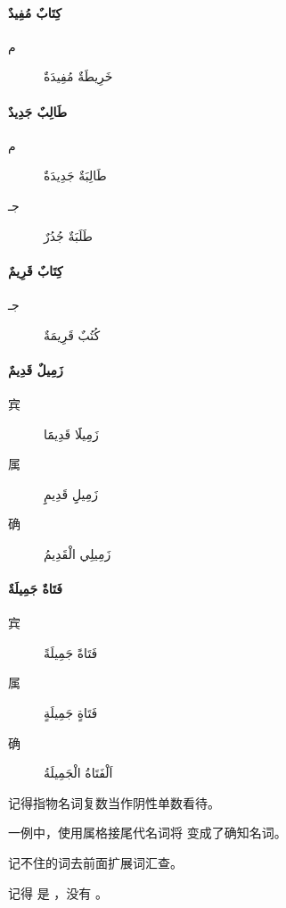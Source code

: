\begin{Arabic}
    \paragraph{كِتَابٌ مُفِيدٌ}
    \begin{description}
        \item [م] خَرِيطَةٌ مُفِيدَةٌ
    \end{description}

    \paragraph{طَالِبٌ جَدِيدٌ}
    \begin{description}
        \item [م] طَالِبَةٌ جَدِيدَةٌ
        \item [جـ] طَلَبَةٌ جُدُرٌ
    \end{description}

    \paragraph{كِتَابٌ قَرِيمٌ}
    \begin{description}
        \item [جـ] كُتُبٌ قَرِيمَةٌ
    \end{description}

    \paragraph{زَمِيلٌ قَدِيمٌ}
    \begin{description}
        \item [宾] زَمِيلََا قَدِيمََا
        \item [属] زَمِيلِِ قَدِيمِِ
        \item [确] زَمِيلِي الْقَدِيمُ
    \end{description}

    \paragraph{فَتَاةٌ جَمِيلَةٌ}
    \begin{description}
        \item [宾] فَتَاةً جَمِيلَةً
        \item [属] فَتَاةٍ جَمِيلَةٍ
        \item [确] اَلْفَتَاةُ الْجَمِيلَةُ 
    \end{description}
\end{Arabic}


\begin{attention}
    记得指物名词复数当作阴性单数看待。

     一例中，使用属格接尾代名词将  变成了确知名词。
\end{attention}

\begin{note}
    记不住的词去前面扩展词汇查。

    记得  是  ，没有 。
\end{note}